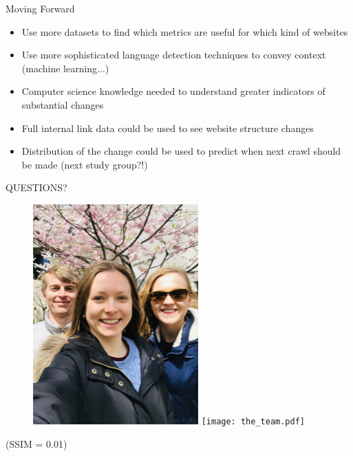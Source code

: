 \documentclass[10pt]{beamer}
\begin{document}
\begin{frame}{Moving Forward}
\large
\begin{itemize}
\item Use more datasets to find which metrics are useful for which kind of websites
\item Use more sophisticated language detection techniques to convey context (machine learning...)
\item Computer science knowledge needed to understand greater indicators of substantial changes
\item Full internal link data could be used to see website structure changes
\item Distribution of the change could be used to predict when next crawl should be made (next study group?!)
\end{itemize}
\end{frame}

\begin{frame}

\LARGE \centering QUESTIONS?

\begin{figure}
\centering
\includegraphics[scale=0.6]{the-team-no-nathan-ian.png}
\texttt{[image: the\_team.pdf]}
\end{figure}
\vspace{-4mm}
(SSIM = 0.01)

\end{frame}
\end{document}
